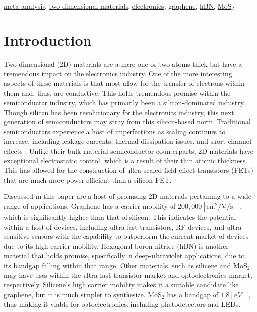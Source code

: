 \documentclass[conference]{IEEEtran}
\begin{document}
\begin{IEEEkeywords}
  \underline{meta-analysis}, \underline{two-dimensional materials}, \underline{electronics}, \underline{graphene}, \underline{hBN}, \underline{MoS$_2$}
\end{IEEEkeywords}

\section{Introduction}

Two-dimensional (2D) materials are a mere one or two atoms thick but have a tremendous impact on the electronics industry. One of the more interesting aspects of these materials is that most allow for the transfer of electrons within them and, thus, are conductive. This holds tremendous promise within the semiconductor industry, which has primarily been a silicon-dominated industry. Though silicon has been revolutionary for the electronics industry, this next generation of semiconductors may stray from this silicon-based norm. Traditional semiconductors experience a host of imperfections as scaling continues to increase, including leakage currents, thermal dissipation issues, and short-channel effects \cite{intro}. Unlike their bulk material semiconductor counterparts, 2D materials have exceptional electrostatic control, which is a result of their thin atomic thickness. This has allowed for the construction of ultra-scaled field effect transistors (FETs) that are much more power-efficient than a silicon FET. 

Discussed in this paper are a host of promising 2D materials pertaining to a wide range of applications. Graphene has a carrier mobility of $200,000 [\si{\centi\meter\squared\per\volt\per\second}]$ \cite{mb3}, which is significantly higher than that of silicon. This indicates the potential within a host of devices, including ultra-fast transistors, RF devices, and ultra-sensitive sensors with the capability to outperform the current market of devices due to its high carrier mobility. Hexagonal boron nitride (hBN) is another material that holds promise, specifically in deep-ultraviolet applications, due to its bandgap falling within that range. Other materials, such as silicene and MoS$_2$, may have uses within the ultra-fast transistor market and optoelectronics market, respectively. Silicene’s high carrier mobility makes it a suitable candidate like graphene, but it is much simpler to synthesize. MoS$_2$ has a bandgap of $1.8[\si{eV}]$ \cite{oc3}, thus making it viable for optoelectronics, including photodetectors and LEDs. 
\end{document}
